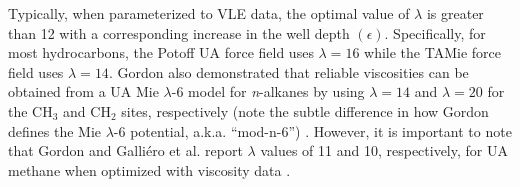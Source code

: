 \documentclass[preprint,letterpaper,floatfix,citeautoscript,aip,jcp]{revtex4-1}
\begin{document}
Typically, when parameterized to VLE data, the optimal value of $\lambda$ is greater than 12 with a corresponding increase in the well depth $(\epsilon)$. Specifically, for most hydrocarbons, the Potoff UA force field \cite{Mie,Potoff_branched} uses $\lambda = 16$ while the TAMie force field \cite{TAMie} uses $\lambda = 14$. Gordon also demonstrated that reliable viscosities can be obtained from a UA Mie $\lambda$-6 model for \textit{n}-alkanes by using $\lambda = 14$ and $\lambda = 20$ for the CH$_3$ and CH$_2$ sites, respectively (note the subtle difference in how Gordon defines the Mie $\lambda$-6 potential, a.k.a. ``mod-n-6'') \cite{Gordon2006}. 
However, it is important to note that Gordon and Galli{\'e}ro et al. report $\lambda$ values of 11 and 10, respectively, for UA methane when optimized with viscosity data \cite{Gordon2006,Galliero2005}.


\end{document}

